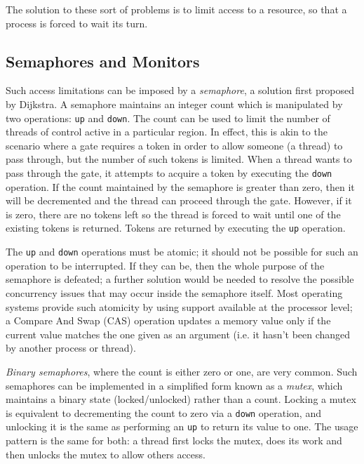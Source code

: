 The solution to these sort of problems is to limit access to a
resource, so that a process is forced to wait its turn.

\subsection{Semaphores and Monitors}
\label{semaphores}

Such access limitations can be imposed by a \emph{semaphore}, a
solution first proposed by Dijkstra\cite{semaphore}.  A semaphore
maintains an integer count which is manipulated by two operations: \texttt{up}
and \texttt{down}.  The count can be used to limit the number of threads of
control active in a particular region.  In effect, this is akin to the
scenario where a gate requires a token in order to allow someone (a
thread) to pass through, but the number of such tokens is limited.
When a thread wants to pass through the gate, it attempts to acquire a
token by executing the \texttt{down} operation.  If the count maintained by
the semaphore is greater than zero, then it will be decremented and
the thread can proceed through the gate.  However, if it is zero,
there are no tokens left so the thread is forced to wait until one of
the existing tokens is returned.  Tokens are returned by executing the
\texttt{up} operation.

The \texttt{up} and \texttt{down} operations must be atomic; it should
not be possible for such an operation to be interrupted.  If they can
be, then the whole purpose of the semaphore is defeated; a further
solution would be needed to resolve the possible concurrency issues
that may occur inside the semaphore itself.  Most operating systems
provide such atomicity by using support available at the processor
level; a Compare And Swap (CAS) operation updates a memory value only
if the current value matches the one given as an argument (i.e. it
hasn't been changed by another process or thread).

\emph{Binary semaphores}, where the count is either zero or one, are
very common.  Such semaphores can be implemented in a simplified form
known as a \emph{mutex}, which maintains a binary state
(locked/unlocked) rather than a count.  Locking a mutex is equivalent
to decrementing the count to zero via a \texttt{down} operation, and unlocking
it is the same as performing an \texttt{up} to return its value to one.  The
usage pattern is the same for both: a thread first locks the mutex,
does its work and then unlocks the mutex to allow others access.

